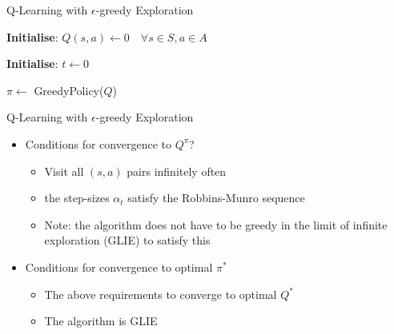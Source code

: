 \documentclass[aspectratio=169]{../latex_main/tntbeamer}  %
\begin{document}

\begin{frame}[c]{Q-Learning with $\epsilon$-greedy Exploration}
	
	\begin{algorithm}[H]
        \caption{Tabular Q-Learning}
        \DontPrintSemicolon
        \LinesNotNumbered
        
    
       \textbf{Initialise}: $Q(s,a) \leftarrow 0 \quad \forall s \in S, a \in A$
        
        \textbf{Initialise}: $t \gets 0$
    
        
        $\pi \gets$ GreedyPolicy($Q$)
        
    \end{algorithm}
	
\end{frame}
\begin{frame}[c]{Q-Learning with $\epsilon$-greedy Exploration}
	
	\begin{itemize}
		\item Conditions for convergence to $Q^\pi$?
		\begin{itemize}
			\item Visit all $(s, a)$ pairs infinitely often
			\item the step-sizes $\alpha_t$ satisfy the Robbins-Munro sequence
			\item Note: the algorithm does not have to be greedy in the limit of infinite exploration (GLIE) to satisfy this
		\end{itemize}
		\bigskip
		\item Conditions for convergence to optimal $\pi^*$
		\begin{itemize}
			\item The above requirements to converge to optimal $Q^*$
			\item The algorithm is GLIE
		\end{itemize}
	\end{itemize}
\end{frame}
\end{document}
